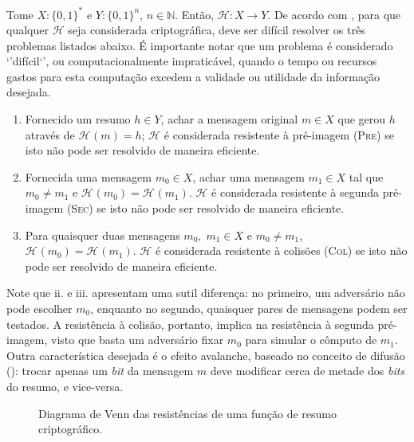 \documentclass{ufsctex/ufsctex}
\newcommand{\hh}{$\mathcal{H}$}
\newcommand{\hash}[2][]{\mathcal{H}^{#1}(#2)}
\def\precircle{(0.0, 0) circle (2.0cm)}
\def\seccircle{(2.5, 0) circle (2.0cm)}
\def\colcircle{(2.5, 0) circle (1.5cm)}
\begin{document}
Tome $X : \{0, 1\}^{*}$ e $Y : \{0, 1\}^{n}$, $n \in \mathbb{N}$. Então,
$\mathcal{H} : X \longrightarrow Y$. De acordo com
\cite{stinson2005cryptography}, para que qualquer \hh{} seja considerada
criptográfica, deve ser difícil resolver os três problemas listados abaixo.
É importante notar que um problema é considerado `'difícil`', ou
computacionalmente impraticável, quando o tempo ou recursos gastos para esta
computação excedem a validade ou utilidade da informação desejada.

\begin{enumerate}[label=\roman*.]

  \item Fornecido um resumo $h \in Y$, achar a mensagem original $m \in X$ que
    gerou $h$ através de $\hash{m} = h$; \hh{} é considerada resistente à
    pré-imagem (\textsc{Pre}) se isto não pode ser resolvido de maneira
    eficiente.

  \item Fornecida uma mensagem $m_0 \in X$, achar uma mensagem $m_1 \in X$ tal
    que $m_0 \neq m_1$ e $\hash{m_0} = \hash{m_1}$. \hh{} é considerada
    resistente à segunda pré-imagem (\textsc{Sec}) se isto não pode ser
    resolvido de maneira eficiente.

  \item Para quaisquer duas mensagens $m_0, \; m_1 \in X$ e $m_0 \neq m_1$,
    $\hash{m_0} = \hash{m_1}$. \hh{} é considerada resistente à colisões
    (\textsc{Col}) se isto não pode ser resolvido de maneira eficiente.

\end{enumerate}

Note que ii. e iii. apresentam uma sutil diferença: no primeiro, um adversário
não pode escolher $m_0$, enquanto no segundo, quaisquer pares de mensagens
podem ser testados. A resistência à colisão, portanto, implica na resistência
à segunda pré-imagem, visto que basta um adversário fixar $m_0$ para simular
o cômputo de $m_1$. Outra característica desejada é o efeito avalanche,
baseado no conceito de difusão (\cite{Stallings:2010:CNS:1824151}): trocar
apenas um \emph{bit} da mensagem $m$ deve modificar cerca de metade dos
\emph{bits} do resumo, e vice-versa.

\begin{figure}[htbp]
  \centering
    \caption{Diagrama de Venn das resistências de uma função de resumo
      criptográfico.}
    \label{fig:1}
\end{figure}
\end{document}
